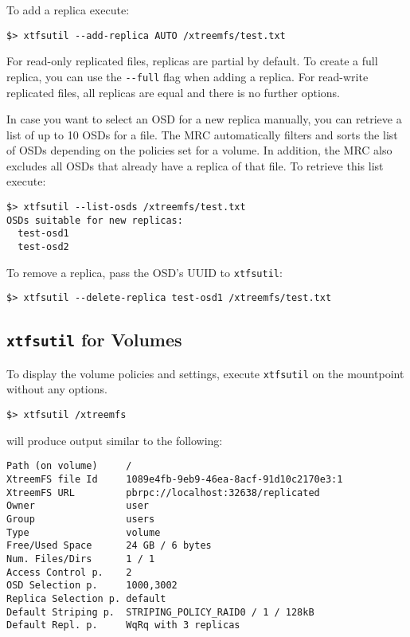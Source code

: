 \documentclass[a4paper,10pt]{book}
\begin{document}
To add a replica execute:

\begin{verbatim}
$> xtfsutil --add-replica AUTO /xtreemfs/test.txt
\end{verbatim}

For read-only replicated files, replicas are partial by default. To create a full replica, you can use the \verb|--full| flag when adding a replica. For read-write replicated files, all replicas are equal and there is no further options.

In case you want to select an OSD for a new replica manually, you can retrieve a list of up to 10 OSDs for a file. The MRC automatically filters and sorts the list of OSDs depending on the policies set for a volume. In addition, the MRC also excludes all OSDs that already have a replica of that file. To retrieve this list execute:

\begin{verbatim}
$> xtfsutil --list-osds /xtreemfs/test.txt
OSDs suitable for new replicas:
  test-osd1
  test-osd2
\end{verbatim}

To remove a replica, pass the OSD's UUID to \texttt{xtfsutil}:

\begin{verbatim}
$> xtfsutil --delete-replica test-osd1 /xtreemfs/test.txt
\end{verbatim}

\subsection{\texttt{xtfsutil} for Volumes}
\label{sec:xtfsutil_volumes}

To display the volume policies and settings, execute \texttt{xtfsutil} on the mountpoint without any options.

\begin{verbatim}
$> xtfsutil /xtreemfs
\end{verbatim}

will produce output similar to the following:

\begin{verbatim}
Path (on volume)     /
XtreemFS file Id     1089e4fb-9eb9-46ea-8acf-91d10c2170e3:1
XtreemFS URL         pbrpc://localhost:32638/replicated
Owner                user
Group                users
Type                 volume
Free/Used Space      24 GB / 6 bytes
Num. Files/Dirs      1 / 1
Access Control p.    2
OSD Selection p.     1000,3002
Replica Selection p. default
Default Striping p.  STRIPING_POLICY_RAID0 / 1 / 128kB
Default Repl. p.     WqRq with 3 replicas
\end{verbatim}
\end{document}
